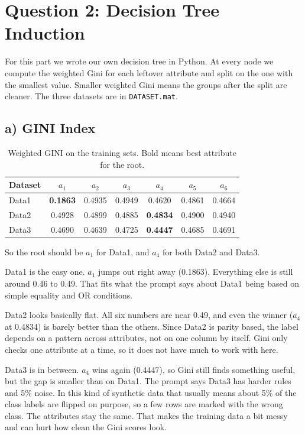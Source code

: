 \documentclass[11pt]{article}
\begin{document}
\section*{Question 2: Decision Tree Induction}

For this part we wrote our own decision tree in Python. At every node we compute the weighted Gini for each leftover attribute and split on the one with the smallest value. Smaller weighted Gini means the groups after the split are cleaner. The three datasets are in \texttt{DATASET.mat}.

\subsection*{a) GINI Index}

\begin{table}[h!]
\centering
\begin{tabular}{|l|c|c|c|c|c|c|}
\hline
\textbf{Dataset} & $a_1$ & $a_2$ & $a_3$ & $a_4$ & $a_5$ & $a_6$ \tabularnewline \hline
Data1 & \textbf{0.1863} & 0.4935 & 0.4949 & 0.4620 & 0.4861 & 0.4664 \tabularnewline \hline
Data2 & 0.4928 & 0.4899 & 0.4885 & \textbf{0.4834} & 0.4900 & 0.4940 \tabularnewline \hline
Data3 & 0.4690 & 0.4639 & 0.4725 & \textbf{0.4447} & 0.4685 & 0.4691 \tabularnewline \hline
\end{tabular}
\caption{Weighted GINI on the training sets. Bold means best attribute for the root.}
\end{table}

So the root should be $a_1$ for Data1, and $a_4$ for both Data2 and Data3.

Data1 is the easy one. $a_1$ jumps out right away (0.1863). Everything else is still around 0.46 to 0.49. That fits what the prompt says about Data1 being based on simple equality and OR conditions.

Data2 looks basically flat. All six numbers are near 0.49, and even the winner ($a_4$ at 0.4834) is barely better than the others. Since Data2 is parity based, the label depends on a pattern across attributes, not on one column by itself. Gini only checks one attribute at a time, so it does not have much to work with here.

Data3 is in between. $a_4$ wins again (0.4447), so Gini still finds something useful, but the gap is smaller than on Data1. The prompt says Data3 has harder rules and 5\% noise. In this kind of synthetic data that usually means about 5\% of the class labels are flipped on purpose, so a few rows are marked with the wrong class. The attributes stay the same. That makes the training data a bit messy and can hurt how clean the Gini scores look.
\end{document}
